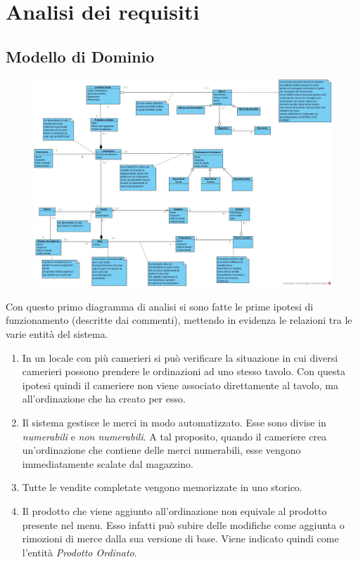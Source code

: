 \chapter{Analisi dei requisiti}
\label{analisi}

\section{Modello di Dominio}
\begin{figure}[H]
	\centering
	\includegraphics[width=1\textwidth]{Immagini/modello_dominio.jpg}
\end{figure}
Con questo primo diagramma di analisi si sono fatte le prime ipotesi di funzionamento (descritte dai commenti), mettendo in evidenza le relazioni tra le varie entità del sistema.

\begin{enumerate}
	\item In un locale con più camerieri si può verificare la situazione in cui diversi camerieri possono prendere le ordinazioni ad uno stesso tavolo. Con questa ipotesi quindi il cameriere non viene associato direttamente al tavolo, ma all'ordinazione che ha creato per esso.
	\item Il sistema gestisce le merci in modo automatizzato. Esse sono divise in \textit{numerabili} e \textit{non numerabili}. A tal proposito, quando il cameriere crea un'ordinazione che contiene delle merci numerabili, esse vengono immediatamente scalate dal magazzino.
	\item Tutte le vendite completate vengono memorizzate in uno storico.
	\item Il prodotto che viene aggiunto all'ordinazione non equivale al prodotto presente nel menu. Esso infatti può subire delle modifiche come aggiunta o rimozioni di merce dalla sua versione di base. Viene indicato quindi come l'entità \textit{Prodotto Ordinato}.
\end{enumerate}
\newpage
